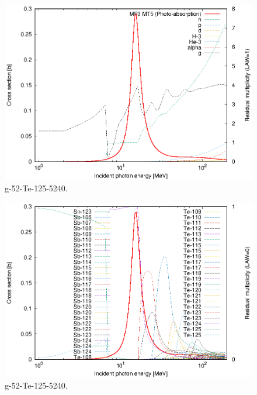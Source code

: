 \begin{figure}
 \includegraphics[width=\linewidth]{eps/g_52-Te-125_5240.eps}
  \caption{g-52-Te-125-5240.}
\end{figure}
\begin{figure}
 \includegraphics[width=\linewidth]{eps-law0/g_52-Te-125_5240.eps}
 \caption{g-52-Te-125-5240.}
\end{figure}
\newpage \clearpage

